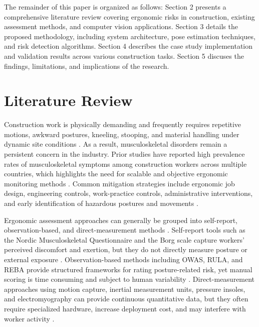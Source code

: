 \documentclass[11pt]{article}
\begin{document}
  The remainder of this paper is organized as follows: Section 2 presents a comprehensive literature review covering ergonomic risks in construction, existing assessment methods, and computer vision applications. Section 3 details the proposed methodology, including system architecture, pose estimation techniques, and risk detection algorithms. Section 4 describes the case study implementation and validation results across various construction tasks. Section 5 discuses the findings, limitations, and implications of the research. 

\section{Literature Review}
Construction work is physically demanding and frequently requires repetitive motions, awkward postures, kneeling, stooping, and material handling under dynamic site conditions \citep{inyang2012ergonomic}. As a result, musculoskeletal disorders remain a persistent concern in the industry. Prior studies have reported high prevalence rates of musculoskeletal symptoms among construction workers across multiple countries, which highlights the need for scalable and objective ergonomic monitoring methods \citep{massirisfernandez2020ergonomic,chen2024automatic}. Common mitigation strategies include ergonomic job design, engineering controls, work-practice controls, administrative interventions, and early identification of hazardous postures and movements \citep{antwi2018wearable}.

Ergonomic assessment approaches can generally be grouped into self-report, observation-based, and direct-measurement methods \citep{tao2024evaluation}. Self-report tools such as the Nordic Musculoskeletal Questionnaire and the Borg scale capture workers' perceived discomfort and exertion, but they do not directly measure posture or external exposure \citep{kuorinka1987standardised,borg1982psychophysical}. Observation-based methods including OWAS, RULA, and REBA provide structured frameworks for rating posture-related risk, yet manual scoring is time consuming and subject to human variability \citep{karhu1977correcting,mcatamney1993rula,hignett2000rapid,zhang2017real}. Direct-measurement approaches using motion capture, inertial measurement units, pressure insoles, and electromyography can provide continuous quantitative data, but they often require specialized hardware, increase deployment cost, and may interfere with worker activity \citep{mudiyanselage2021automated,zhao2018health,li2024data}.
\end{document}
